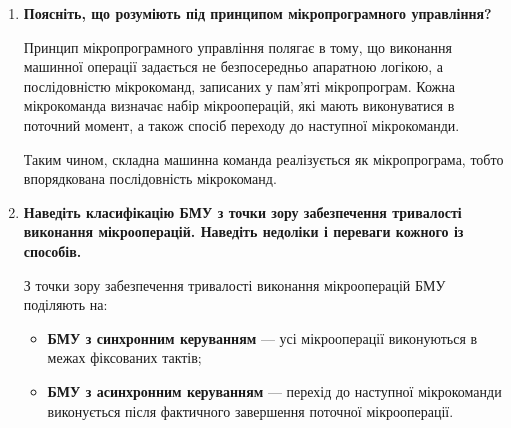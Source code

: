 \documentclass[12pt,a4paper]{article}
\begin{document}
\begin{enumerate}
        \textbf{Призначення БМУ} полягає у формуванні керуючих сигналів для всіх вузлів операційного пристрою та забезпеченні правильної часової послідовності виконання мікрооперацій.

        \textbf{Класифікація БМУ} може бути такою:
        \begin{itemize}
            \item за способом формування керування: з жорсткою логікою, мікропрограмні;
            \item за способом синхронізації: синхронні, асинхронні;
            \item за способом адресації мікрокоманд: з абсолютною, відносною, примусовою адресацією;
            \item за способом формування зони керуючих сигналів: з горизонтальним, вертикальним, змішаним програмуванням;
            \item за способом урахування тривалості мікрооперацій: з фіксованим тактом, з урахуванням змінної тривалості.
        \end{itemize}

        \item \textbf{Поясніть, що розуміють під принципом мікропрограмного управління?}

        Принцип мікропрограмного управління полягає в тому, що виконання машинної операції задається не безпосередньо апаратною логікою, а послідовністю мікрокоманд, записаних у пам'яті мікропрограм. Кожна мікрокоманда визначає набір мікрооперацій, які мають виконуватися в поточний момент, а також спосіб переходу до наступної мікрокоманди.

        Таким чином, складна машинна команда реалізується як мікропрограма, тобто впорядкована послідовність мікрокоманд.

        \item \textbf{Наведіть класифікацію БМУ з точки зору забезпечення тривалості виконання мікрооперацій. Наведіть недоліки і переваги кожного із способів.}

        З точки зору забезпечення тривалості виконання мікрооперацій БМУ поділяють на:
        \begin{itemize}
            \item \textbf{БМУ з синхронним керуванням} --- усі мікрооперації виконуються в межах фіксованих тактів;
            \item \textbf{БМУ з асинхронним керуванням} --- перехід до наступної мікрокоманди виконується після фактичного завершення поточної мікрооперації.
        \end{itemize}


\end{enumerate}
\end{document}
